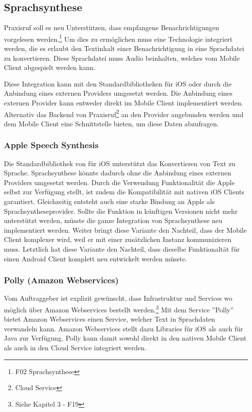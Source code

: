 \subsection{Sprachsynthese}

Praxisruf soll es neu Unterstützen, dass empfangene Benachrichtigungen vorgelesen werden.\footnote{F02 Sprachsynthese}
Um dies zu ermöglichen muss eine Technologie integriert werden, die es erlaubt den Textinhalt einer Benachrichtigung in eine Sprachdatei zu konvertieren.
Diese Sprachdatei muss Audio beinhalten, welches vom Mobile Client abgespielt werden kann.

Diese Integration kann mit den Standardbibliotheken für iOS oder durch die Anbindung eines externen Providers umgesetzt werden.
Die Anbindung eines externen Provider kann entweder direkt im Mobile Client implementiert werden.
Alternativ das Backend von Praxisruf\footnote{Cloud Service} an den Provider angebunden werden und dem Mobile Client eine Schnittstelle bieten, um diese Daten abzufragen.

\subsubsection*{Apple Speech Synthesis}

Die Standardbibliothek von für iOS unterstützt das Konvertieren von Text zu Sprache.\cite{ios_speech_synthesis}
Sprachsynthese könnte dadurch ohne die Anbindung eines externen Providers umgesetzt werden.
Durch die Verwendung Funktionalität die Apple selbst zur Verfügung stellt, ist zudem die Kompatibilität mit nativen iOS Clients garantiert.
Gleichzeitig entsteht auch eine starke Bindung an Apple als Sprachsyntheseprovider.
Sollte die Funktion in künftigen Versionen nicht mehr unterstützt werden, müsste die ganze Integration von Sprachsynthese neu implementiert werden.
Weiter bringt diese Variante den Nachteil, dass der Mobile Client komplexer wird, weil er mit einer zusätzlichen Instanz kommunizieren muss.
Letztlich hat diese Variante den Nachteil, dass dieselbe Funktionaltät für einen Android Client komplett neu entwickelt werden müsste.

\subsubsection*{Polly (Amazon Webservices)}

Vom Auftraggeber ist explizit gewünscht, dass Infrastruktur und Services wo möglich über Amazon Webservices bestellt werden.\footnote{Siehe Kapitel 3 - F19}
Mit dem Service ''Polly'' bietet Amazon Webservices einen Service, welcher Text in Sprachdaten verwandeln kann.\cite{aws_polly}
Amazon Webservices stellt dazu Libraries für iOS\cite{aws_polly_ios} als auch für Java zur Verfügung\cite{aws_polly_java}.
Polly kann damit sowohl direkt in den nativen Mobile Client als auch in den Cloud Service integriert werden.

